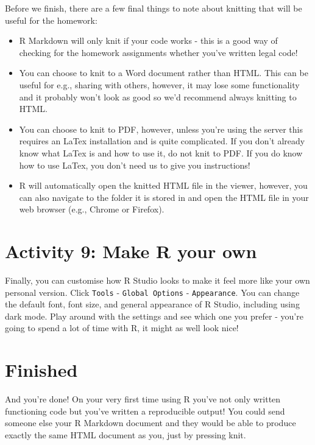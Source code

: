\documentclass[
  oneside]{book}
\providecommand{\tightlist}{%
  \setlength{\itemsep}{0pt}\setlength{\parskip}{0pt}}
\begin{document}
Before we finish, there are a few final things to note about knitting that will be useful for the homework:

\begin{itemize}
\tightlist
\item
  R Markdown will only knit if your code works - this is a good way of checking for the homework assignments whether you've written legal code!\\
\item
  You can choose to knit to a Word document rather than HTML. This can be useful for e.g., sharing with others, however, it may lose some functionality and it probably won't look as good so we'd recommend always knitting to HTML.
\item
  You can choose to knit to PDF, however, unless you're using the server this requires an LaTex installation and is quite complicated. If you don't already know what LaTex is and how to use it, do not knit to PDF. If you do know how to use LaTex, you don't need us to give you instructions!
\item
  R will automatically open the knitted HTML file in the viewer, however, you can also navigate to the folder it is stored in and open the HTML file in your web browser (e.g., Chrome or Firefox).
\end{itemize}

\hypertarget{activity-9-make-r-your-own}{%
\section{Activity 9: Make R your own}\label{activity-9-make-r-your-own}}

Finally, you can customise how R Studio looks to make it feel more like your own personal version. Click \texttt{Tools} - \texttt{Global\ Options} - \texttt{Appearance}. You can change the default font, font size, and general appearance of R Studio, including using dark mode. Play around with the settings and see which one you prefer - you're going to spend a lot of time with R, it might as well look nice!

\hypertarget{finished}{%
\section{Finished}\label{finished}}

And you're done! On your very first time using R you've not only written functioning code but you've written a reproducible output! You could send someone else your R Markdown document and they would be able to produce exactly the same HTML document as you, just by pressing knit.
\end{document}
